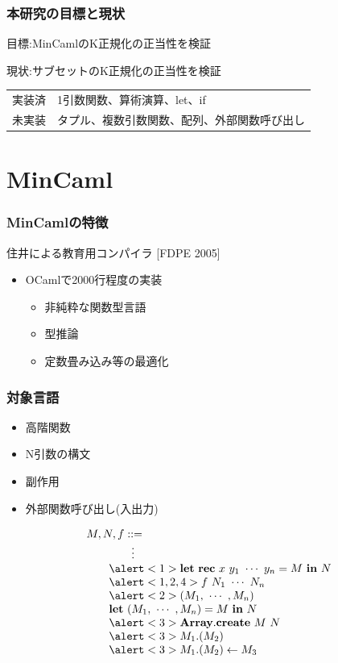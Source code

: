 \documentclass[dvipdfmx,cjk,xcolor=dvipsnames,envcountsect,notheorems,12pt]{beamer}
\theoremstyle{definition}
\newcommand{\keyword}[1]{\mathbf{#1}}
\newcommand{\LET}{\keyword{let}}
\newcommand{\REC}{\keyword{rec}}
\newcommand{\ARRAY}{\keyword{Array}}
\newcommand{\CREATE}{\keyword{create}}
\newcommand{\IN}{\keyword{in}}
\begin{document}
\begin{frame}
	\frametitle{本研究の目標と現状}
	\Large 目標:MinCamlのK正規化の正当性を検証

	\vfill

	現状:サブセットのK正規化の正当性を検証
	\begin{center}
		\normalsize
		\begin{tabular}{ll}
			実装済 & 1引数関数、算術演算、let、if \\
			未実装 & タプル、複数引数関数、配列、外部関数呼び出し \\
		\end{tabular}
	\end{center}
\end{frame}

\section{MinCaml}

\begin{frame}
	\frametitle{MinCamlの特徴}
	\Large 住井による教育用コンパイラ [FDPE 2005]
	\begin{itemize}
		\item OCamlで2000行程度の実装
			\begin{itemize}
				\item 非純粋な関数型言語
				\item 型推論
				\item 定数畳み込み等の最適化
			\end{itemize}
	\end{itemize}
\end{frame}

\begin{frame}
	\frametitle{対象言語}
	\Large
	\begin{itemize}
		\item \alert<1>{高階関数}
		\item \alert<2>{N引数の構文}
		\item \alert<3>{副作用}
		\item \alert<4>{外部関数呼び出し(入出力)}
	\end{itemize}
	{\normalsize
	\[
	\begin{array}{l}
		M, N, f ::= \\
		\qquad \qquad \vdots\\
		\qquad \alert<1>{\LET~\REC~x~y_1~\cdots~y_n=M~\IN~N}\\
		\qquad \alert<1,2,4>{f~N_1~\cdots~N_n}\\
		\qquad \alert<2>{(M_1,~\cdots~,M_n)}\\
		\qquad \LET~(M_1,~\cdots~,M_n)=M~\IN~N\\
		\qquad \alert<3>{\ARRAY.\CREATE~M~N}\\
		\qquad \alert<3>{M_1.(M_2)}\\
		\qquad \alert<3>{M_1.(M_2)\leftarrow M_3}\\
	\end{array}
	\]}
	\pause
	\pause
	\pause
\end{frame}
\end{document}
